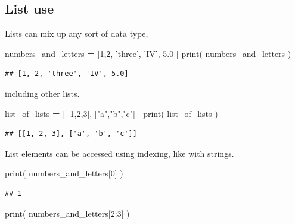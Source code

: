 \documentclass[]{book}
\newenvironment{Shaded}{\begin{snugshade}}{\end{snugshade}}
\newcommand{\BuiltInTok}[1]{#1}
\newcommand{\DecValTok}[1]{\textcolor[rgb]{0.00,0.00,0.81}{#1}}
\newcommand{\FloatTok}[1]{\textcolor[rgb]{0.00,0.00,0.81}{#1}}
\newcommand{\NormalTok}[1]{#1}
\newcommand{\OperatorTok}[1]{\textcolor[rgb]{0.81,0.36,0.00}{\textbf{#1}}}
\newcommand{\StringTok}[1]{\textcolor[rgb]{0.31,0.60,0.02}{#1}}
\theoremstyle{definition}
\theoremstyle{definition}
\theoremstyle{definition}
\theoremstyle{remark}
\begin{document}
\hypertarget{list-use}{%
\subsection{List use}\label{list-use}}

Lists can mix up any sort of data type,

\begin{Shaded}
\begin{Highlighting}[]
\NormalTok{numbers_and_letters }\OperatorTok{=}\NormalTok{ [}\DecValTok{1}\NormalTok{,}\DecValTok{2}\NormalTok{, }\StringTok{'three'}\NormalTok{, }\StringTok{'IV'}\NormalTok{, }\FloatTok{5.0}\NormalTok{ ]}
\BuiltInTok{print}\NormalTok{( numbers_and_letters )}
\end{Highlighting}
\end{Shaded}

\begin{verbatim}
## [1, 2, 'three', 'IV', 5.0]
\end{verbatim}

including other lists.

\begin{Shaded}
\begin{Highlighting}[]
\NormalTok{list_of_lists }\OperatorTok{=}\NormalTok{ [ [}\DecValTok{1}\NormalTok{,}\DecValTok{2}\NormalTok{,}\DecValTok{3}\NormalTok{], [}\StringTok{"a"}\NormalTok{,}\StringTok{"b"}\NormalTok{,}\StringTok{"c"}\NormalTok{] ]}
\BuiltInTok{print}\NormalTok{( list_of_lists )}
\end{Highlighting}
\end{Shaded}

\begin{verbatim}
## [[1, 2, 3], ['a', 'b', 'c']]
\end{verbatim}

List elements can be accessed using indexing, like with strings.

\begin{Shaded}
\begin{Highlighting}[]
\BuiltInTok{print}\NormalTok{( numbers_and_letters[}\DecValTok{0}\NormalTok{] )}
\end{Highlighting}
\end{Shaded}

\begin{verbatim}
## 1
\end{verbatim}

\begin{Shaded}
\begin{Highlighting}[]
\BuiltInTok{print}\NormalTok{( numbers_and_letters[}\DecValTok{2}\NormalTok{:}\DecValTok{3}\NormalTok{] )}
\end{Highlighting}
\end{Shaded}
\end{document}
